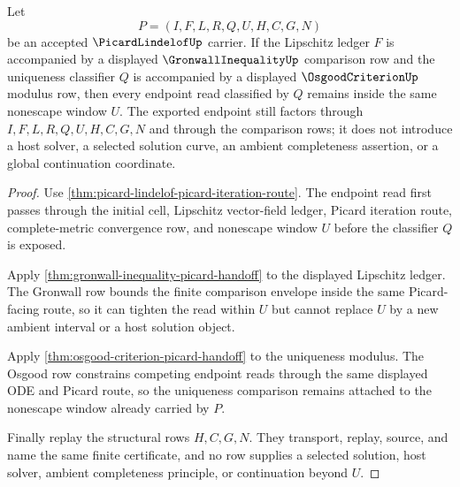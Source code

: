 \begin{theorem}
\label{thm:picard-lindelof-gronwall-osgood-nonescape}
Let
$$
P=(I,F,L,R,Q,U,H,C,G,N)
$$
be an accepted $\PicardLindelofUp$ carrier. If the Lipschitz ledger $F$ is accompanied by a displayed $\GronwallInequalityUp$ comparison row and the uniqueness classifier $Q$ is accompanied by a displayed $\OsgoodCriterionUp$ modulus row, then every endpoint read classified by $Q$ remains inside the same nonescape window $U$. The exported endpoint still factors through $I,F,L,R,Q,U,H,C,G,N$ and through the comparison rows; it does not introduce a host solver, a selected solution curve, an ambient completeness assertion, or a global continuation coordinate.
\end{theorem}
\begin{proof}
Use \autoref{thm:picard-lindelof-picard-iteration-route}. The endpoint read first passes through the initial cell, Lipschitz vector-field ledger, Picard iteration route, complete-metric convergence row, and nonescape window $U$ before the classifier $Q$ is exposed.

Apply \autoref{thm:gronwall-inequality-picard-handoff} to the displayed Lipschitz ledger. The Gronwall row bounds the finite comparison envelope inside the same Picard-facing route, so it can tighten the read within $U$ but cannot replace $U$ by a new ambient interval or a host solution object.

Apply \autoref{thm:osgood-criterion-picard-handoff} to the uniqueness modulus. The Osgood row constrains competing endpoint reads through the same displayed ODE and Picard route, so the uniqueness comparison remains attached to the nonescape window already carried by $P$.

Finally replay the structural rows $H,C,G,N$. They transport, replay, source, and name the same finite certificate, and no row supplies a selected solution, host solver, ambient completeness principle, or continuation beyond $U$.
\end{proof}

